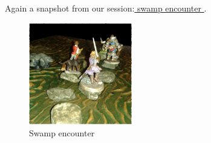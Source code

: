 Again a snapshot from our session:\hyperref[fig:Swamp-encounter-410834455]{ swamp encounter } . \\

\begin{figure}[h]
	\centering
	\includegraphics[width=0.4\textwidth]{images/Swamp-encounter-410834455_mod.jpg}
	\caption{Swamp encounter}
	\label{fig:Swamp-encounter-410834455}
\end{figure}

